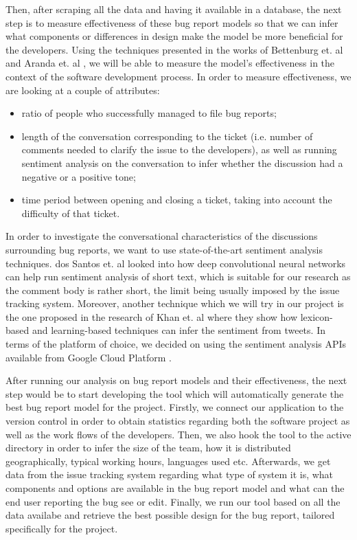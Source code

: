 \documentclass[11pt,english,twocolumn]{article}
\begin{document}
Then, after scraping all the data and having it available in a database, the next step is
to measure effectiveness of these bug report models so that we can infer what components
or differences in design make the model be more beneficial for the developers. Using the
techniques presented in the works of Bettenburg et. al \cite{bettenburg2008makes} and 
Aranda et. al \cite{aranda2009secret}, we will be able to measure the model's 
effectiveness in the context of the software development process. In order to measure 
effectiveness, we are looking at a couple of attributes:
	\begin{itemize}
		\item ratio of people who successfully managed to file bug reports;
		\item length of the conversation corresponding to the ticket (i.e. number of 
		comments needed to clarify the issue to the developers), as well as running 
		sentiment analysis on the conversation to infer whether the discussion had a 
		negative or a positive tone;
		\item time period between opening and closing a ticket, taking into account 
		the difficulty of that ticket.
	\end{itemize}
In order to investigate the conversational characteristics of the discussions surrounding
bug reports, we want to use state-of-the-art sentiment analysis techniques. dos Santos et. al 
\cite{dos2014deep} looked into how deep convolutional neural networks can help run sentiment 
analysis of short text, which is suitable for our research as the comment body is rather 
short, the limit being usually imposed by the issue tracking system. Moreover, another 
technique which we will try in our project is the one proposed in the research of 
Khan et. al \cite{khan2015combining} where they show how lexicon-based and learning-based
techniques can infer the sentiment from tweets. In terms of the platform of choice, we 
decided on using the sentiment analysis APIs available from Google Cloud Platform \cite{gcp}.

After running our analysis on bug report models and their effectiveness, the next step
would be to start developing the tool which will automatically generate the best bug
report model for the project. Firstly, we connect our application to the version control
in order to obtain statistics regarding both the software project as well as the work flows
of the developers. Then, we also hook the tool to the active directory in order to infer the
size of the team, how it is distributed geographically, typical working hours, languages used
etc. Afterwards, we get data from the issue tracking system regarding what type of system it is,
what components and options are available in the bug report model and what can the end user 
reporting the bug see or edit. Finally, we run our tool based on all the data availabe 
and retrieve the best possible design for the bug report, tailored specifically for the project.
\end{document}
